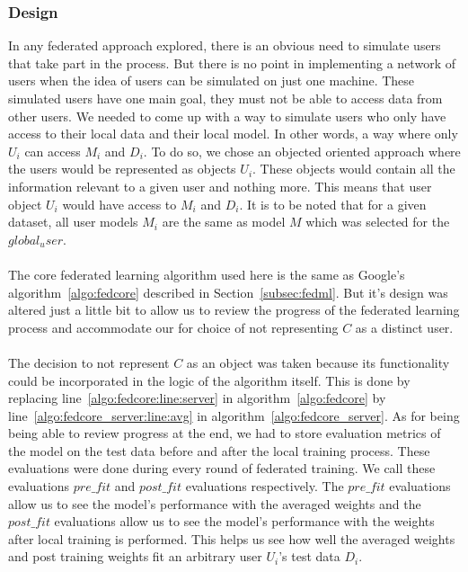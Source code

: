 \documentclass[12pt]{article}
\begin{document}
\subsubsection{Design}
In any federated approach explored, there is an obvious need to simulate users that take part in the process. But there is no point in  implementing a network of users when the idea of users can be simulated on just one machine. These simulated users have one main goal, they must not be able to access data from other users. We needed to come up with a way to simulate users who only have access to their local data and their local model. In other words, a way where only $U_i$ can access $M_i$ and $D_i$. To do so, we chose an objected oriented approach where the users would be represented as objects $U_i$. These objects would contain all the information relevant to a given user and nothing more. This means that user object $U_i$ would have access to $M_i$ and $D_i$. It is to be noted that for a given dataset, all user models $M_i$ are the same as model $M$ which was selected for the $global_user$. 
\\\\
The core federated learning algorithm used here is the same as Google's algorithm~\ref{algo:fedcore} described in Section~\ref{subsec:fedml}. But it's design was altered just a little bit to allow us to review the progress of the federated learning process and accommodate our for choice of not representing $C$ as a distinct user. 
\\\\
The decision to not represent $C$ as an object was taken because its functionality could be incorporated in the logic of the algorithm itself. This is done by replacing line~\ref{algo:fedcore:line:server} in algorithm~\ref{algo:fedcore} by line~\ref{algo:fedcore_server:line:avg} in algorithm~\ref{algo:fedcore_server}. As for being being able to review progress at the end, we had to store evaluation metrics of the model on the test data before and after the local training process. These evaluations were done during every round of federated training. We call these evaluations $pre\_fit$ and $post\_fit$ evaluations respectively. The $pre\_fit$ evaluations allow us to see the model's performance with the averaged weights and the $post\_fit$ evaluations allow us to see the model's performance with the weights after local training is performed. This helps us see how well the averaged weights and post training weights fit an arbitrary user $U_i$'s test data $D_i$. 
\\\\
\end{document}
